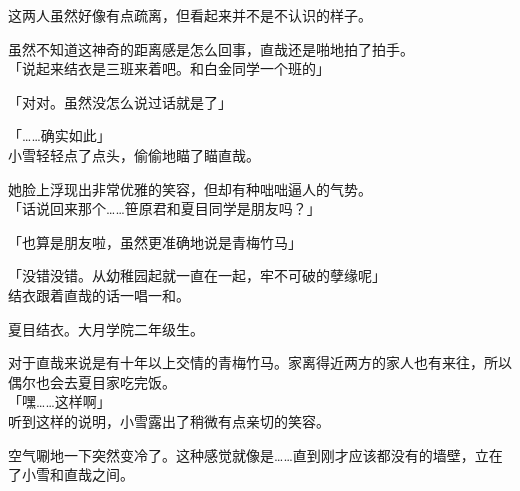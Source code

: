 这两人虽然好像有点疏离，但看起来并不是不认识的样子。

虽然不知道这神奇的距离感是怎么回事，直哉还是啪地拍了拍手。\\

「说起来结衣是三班来着吧。和白金同学一个班的」

「对对。虽然没怎么说过话就是了」

「……确实如此」\\

小雪轻轻点了点头，偷偷地瞄了瞄直哉。

她脸上浮现出非常优雅的笑容，但却有种咄咄逼人的气势。\\

「话说回来那个……笹原君和夏目同学是朋友吗？」

「也算是朋友啦，虽然更准确地说是青梅竹马」

「没错没错。从幼稚园起就一直在一起，牢不可破的孽缘呢」\\

结衣跟着直哉的话一唱一和。

夏目结衣。大月学院二年级生。

对于直哉来说是有十年以上交情的青梅竹马。家离得近两方的家人也有来往，所以偶尔也会去夏目家吃完饭。\\

「嘿……这样啊」\\

听到这样的说明，小雪露出了稍微有点亲切的笑容。

空气唰地一下突然变冷了。这种感觉就像是……直到刚才应该都没有的墙壁，立在了小雪和直哉之间。\\

